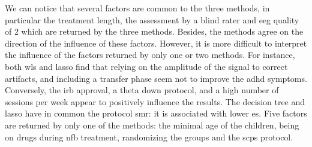 We can notice that several factors are common to the three methods, in particular the treatment length, the assessment 
by a blind rater and \gls{eeg} quality of 2 which are returned by the three methods. Besides, 
the methods agree on the direction of the influence of these factors. However, it is more difficult to interpret the influence of the factors 
returned by only one or two methods. For instance, both \gls{wls} and \gls{lasso} find that  
relying on the amplitude of the signal to correct artifacts, and including a transfer phase seem not to improve the \gls{adhd} symptoms. 
Conversely, the \gls{irb} approval, a theta down protocol, and a high number of sessions per week appear to 
positively influence the results. The decision tree and \gls{lasso} have in common the protocol \gls{smr}: it is associated with lower \gls{es}.
Five factors are returned by only one of the methods: the minimal age of the children, being on drugs 
during \gls{nfb} treatment, randomizing the groups and the \glspl{scp} protocol. 






 

